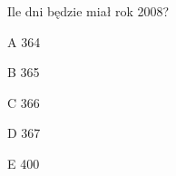 \begin{tresc}
Ile dni będzie miał rok 2008?
\end{tresc}
\begin{wariant}{A} 364 \end{wariant}
\begin{wariant}{B} 365 \end{wariant}
\begin{wariant}{C} 366 \end{wariant}
\begin{wariant}{D} 367 \end{wariant}
\begin{wariant}{E} 400 \end{wariant}
